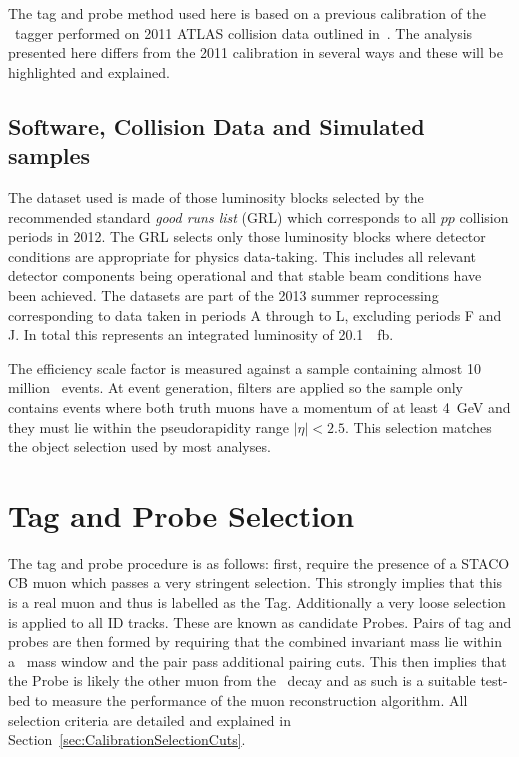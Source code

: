 The tag and probe method used here is based on a previous calibration of the \xsm\ tagger performed on 2011 ATLAS collision data outlined in~\cite{Calibration:2011Note}. The analysis presented here differs from the 2011 calibration in several ways and these will be highlighted and explained.

\subsection*{Software, Collision Data and Simulated samples}

The dataset used is made of those luminosity blocks selected by the recommended standard \emph{good runs list} (GRL) which corresponds to all $pp$ collision periods in 2012. The GRL selects only those luminosity blocks where detector conditions are appropriate for physics data-taking. This includes all relevant detector components being operational and that stable beam conditions have been achieved. The datasets are part of the 2013 summer reprocessing corresponding to data taken in periods A through to L, excluding periods F and J. In total this represents an integrated luminosity of \SI{20.1}{\per\femto\barn}. 

The efficiency scale factor is measured against a sample containing almost 10 million \JMu\ events. At event generation, filters are applied so the sample only contains events where both truth muons have a momentum of at least \SI{4}{\GeV} and they must lie within the pseudorapidity range $|\eta|<2.5$. This selection matches the object selection used by most analyses. 

\section{Tag and Probe Selection} \label{sec:CalibrationSelection}

The tag and probe procedure is as follows: first, require the presence of a STACO CB muon which passes a very stringent selection. This strongly implies that this is a real muon and thus is labelled as the Tag. Additionally a very loose selection is applied to all ID tracks. These are known as candidate Probes. Pairs of tag and probes are then formed by requiring that the combined invariant mass lie within a \jpsi\ mass window and the pair pass additional pairing cuts. This then implies that the Probe is likely the other muon from the \jpsi\ decay and as such is a suitable test-bed to measure the performance of the muon reconstruction algorithm. All selection criteria are detailed and explained in Section~\ref{sec:CalibrationSelectionCuts}.


